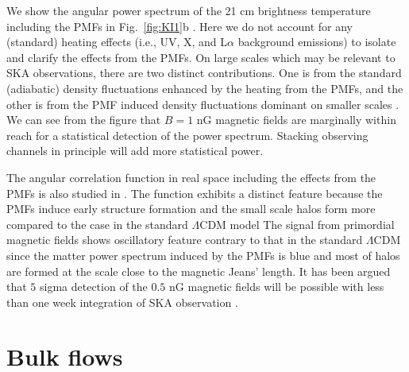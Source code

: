\documentclass{PoS}
\begin{document}
We show the angular power spectrum of the 21 cm brightness temperature
including the PMFs in Fig.~\ref{fig:KI1}b
\citep{2014arXiv1403.2608S}. Here we do not account for any (standard)
heating effects (i.e., UV, X, and L$\alpha$ background emissions) to isolate and
clarify the effects from the PMFs.  On large scales which may be
relevant to SKA 
observations, there are two distinct contributions. One is from the
standard (adiabatic) density fluctuations enhanced by the heating from
the PMFs, and the other is from the PMF induced density fluctuations
dominant on smaller scales
\citep{2006MNRAS.372.1060T,2009ApJ...692..236S}. We can see from the
figure that $B=1$ nG
magnetic fields are marginally within reach for a statistical detection
of the power spectrum. Stacking observing channels in principle will add
more statistical power.

The angular correlation function in real space including the effects
from the PMFs is also studied in \cite{2009JCAP...11..021S}.  The
function exhibits a distinct feature because the PMFs induce early
structure formation and the small scale halos form more compared to the
case in the standard $\Lambda$CDM model The signal from primordial
magnetic fields shows oscillatory feature contrary to that in the
standard $\Lambda$CDM since the matter power spectrum induced by the
PMFs is blue and most of halos are formed at the scale close to the
magnetic Jeans' length. It has been argued that $5$ sigma detection of
the $0.5$ nG magnetic fields will be possible with less than one week
integration of SKA observation \citep{2009JCAP...11..021S}.

\section{Bulk flows}
\end{document}
